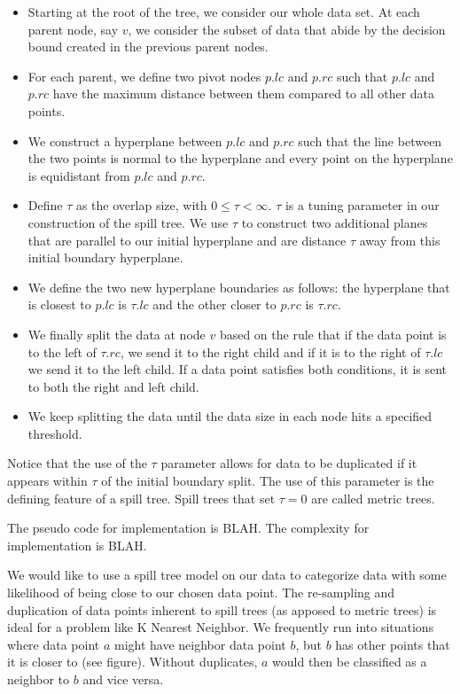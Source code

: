 \begin{itemize}
  \item Starting at the root of the tree, we consider our whole data set. At 
  each parent node, say $v$, we consider the subset of data that abide by the 
  decision bound created in the previous parent nodes.
  \item For each parent, we define two pivot nodes $p.lc$ and $p.rc$ such that 
  $p.lc$ and $p.rc$ have the maximum distance between them compared to all 
  other data points.
  \item We construct a hyperplane between $p.lc$ and $p.rc$ such that the line 
  between the two points is normal to the hyperplane and every point on the 
  hyperplane is equidistant from $p.lc$ and $p.rc$.
  \item Define $\tau$ as the overlap size, with $0 \le \tau < \infty$. $\tau$ 
  is a tuning parameter in our construction of the spill tree. We use $\tau$ 
  to construct two additional planes that are parallel to our initial 
  hyperplane and are distance $\tau$ away from this initial boundary hyperplane.
  \item We define the two new hyperplane boundaries as follows: the hyperplane 
  that is closest to $p.lc$ is $\tau.lc$ and the other closer to $p.rc$ is 
  $\tau.rc$.
  \item We finally split the data at node $v$ based on the rule that if the 
  data point is to the left of $\tau.rc$, we send it to the right child and if 
  it is to the right of $\tau.lc$ we send it to the left child. If a data point 
  satisfies both conditions, it is sent to both the right and left child.
  \item We keep splitting the data until the data size in each node hits a 
  specified threshold.
\end{itemize}

\vspace{5 mm}
\noindent
Notice that the use of the $\tau$ parameter allows for data to be duplicated if 
it appears within $\tau$ of the initial boundary split. The use of this 
parameter is the defining feature of a spill tree. Spill trees that set 
$\tau = 0$ are called metric trees.

\vspace{5 mm}
\noindent
The pseudo code for implementation is BLAH. The complexity for implementation is 
BLAH.

\vspace{5 mm}
\noindent
We would like to use a spill tree model on our data to categorize data with 
some likelihood of being close to our chosen data point. The re-sampling 
and duplication of data points inherent to spill trees (as apposed to metric 
trees) is ideal for a problem like K Nearest Neighbor. We frequently run into 
situations where data point $a$ might have neighbor data point $b$, but $b$ has 
other points that it is closer to (see figure). 
Without duplicates, $a$ would then be classified as a neighbor to $b$ and vice 
versa.

